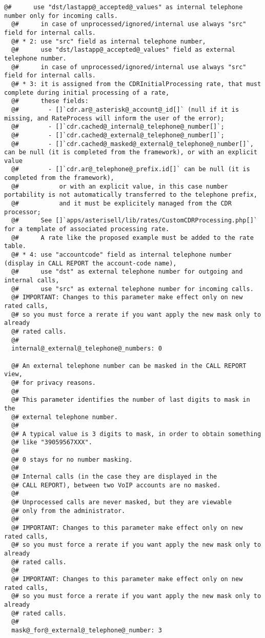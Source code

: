 \documentclass[letterpaper,10pt,english]{sphinxmanual}
\begin{document}
\begin{Verbatim}[commandchars=@\[\]]
  @#      use "dst/lastapp@_accepted@_values" as internal telephone number only for incoming calls.
  @#      in case of unprocessed/ignored/internal use always "src" field for internal calls.
  @# * 2: use "src" field as internal telephone number,
  @#      use "dst/lastapp@_accepted@_values" field as external telephone number.
  @#      in case of unprocessed/ignored/internal use always "src" field for internal calls.
  @# * 3: it is assigned from the CDRInitialProcessing rate, that must complete during initial processing of a rate,
  @#      these fields:
  @#        - []`cdr.ar@_asterisk@_account@_id[]` (null if it is missing, and RateProcess will inform the user of the error);
  @#        - []`cdr.cached@_internal@_telephone@_number[]`;
  @#        - []`cdr.cached@_external@_telephone@_number[]`;
  @#        - []`cdr.cached@_masked@_external@_telephone@_number[]`, can be null (it is completed from the framework), or with an explicit value
  @#        - []`cdr.ar@_telephone@_prefix.id[]` can be null (it is completed from the framework),
  @#           or with an explicit value, in this case number portability is not automatically transferred to the telephone prefix,
  @#           and it must be explicitely managed from the CDR processor;
  @#      See []`apps/asterisell/lib/rates/CustomCDRProcessing.php[]` for a template of associated processing rate.
  @#      A rate like the proposed example must be added to the rate table.
  @# * 4: use "accountcode" field as internal telephone number (display in CALL REPORT the account-code name),
  @#      use "dst" as external telephone number for outgoing and internal calls,
  @#      use "src" as external telephone number for incoming calls.
  @# IMPORTANT: Changes to this parameter make effect only on new rated calls,
  @# so you must force a rerate if you want apply the new mask only to already
  @# rated calls.
  @# 
  internal@_external@_telephone@_numbers: 0

  @# An external telephone number can be masked in the CALL REPORT view,
  @# for privacy reasons.
  @#
  @# This parameter identifies the number of last digits to mask in the
  @# external telephone number.
  @#
  @# A typical value is 3 digits to mask, in order to obtain something
  @# like "39059567XXX".
  @#
  @# 0 stays for no number masking.
  @#
  @# Internal calls (in the case they are displayed in the
  @# CALL REPORT), between two VoIP accounts are no masked.
  @#
  @# Unprocessed calls are never masked, but they are viewable
  @# only from the administrator.
  @#
  @# IMPORTANT: Changes to this parameter make effect only on new rated calls,
  @# so you must force a rerate if you want apply the new mask only to already
  @# rated calls.
  @# 
  @# IMPORTANT: Changes to this parameter make effect only on new rated calls,
  @# so you must force a rerate if you want apply the new mask only to already
  @# rated calls.
  @# 
  mask@_for@_external@_telephone@_number: 3


\end{Verbatim}
\end{document}
